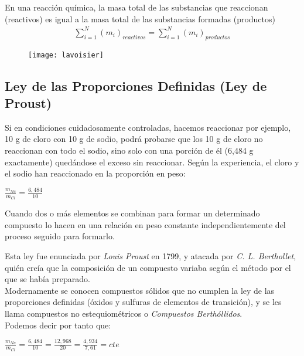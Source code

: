 \begin{law}
En una reacción química, la masa total de las substancias que reaccionan (reactivos) es igual a la masa total de las substancias formadas (productos)
\begin{align}
\sum_{i = 1}^{N}(m_i)_{reactivos} = \sum_{i = 1}^{N}(m_i)_{productos}
\end{align}
\end{law}
\begin{figure}[h!]
	\centering
	\texttt{[image: lavoisier]}
\end{figure}

\subsection{Ley de las Proporciones Definidas (Ley de Proust)}

Si en condiciones cuidadosamente controladas, hacemos reaccionar por ejemplo, 10 g de cloro con 10 g de sodio, podrá probarse que los 10 g de cloro no reaccionan con todo el sodio, sino solo con una porción de él (6,484 g exactamente) quedándose el exceso sin reaccionar. Según la experiencia, el cloro y el sodio han reaccionado en la proporción en peso:\\

\begin{center}
	$\frac{m_{Na}}{m_{Cl}}=\frac{6,484}{10}$
\end{center}

\begin{law}
	Cuando dos o más elementos se combinan para formar un determinado compuesto lo hacen en una relación en peso constante independientemente del proceso seguido para formarlo.
\end{law}

Esta ley fue enunciada por \emph{Louis Proust} en 1799, y atacada por \emph{C. L. Berthollet}, quién creía que la composición de un compuesto variaba según el método por el que se había preparado.\\

Modernamente se conocen compuestos sólidos que no cumplen la ley de las proporciones definidas (óxidos y sulfuras de elementos de transición), y se les llama compuestos no estequiométricos o \emph{Compuestos Berthóllidos}.\\

Podemos decir por tanto que:

\begin{center}
		$\frac{m_{Na}}{m_{Cl}}=\frac{6,484}{10}=\frac{12,968}{20}=\frac{4,934}{7,61}=cte$
\end{center}

